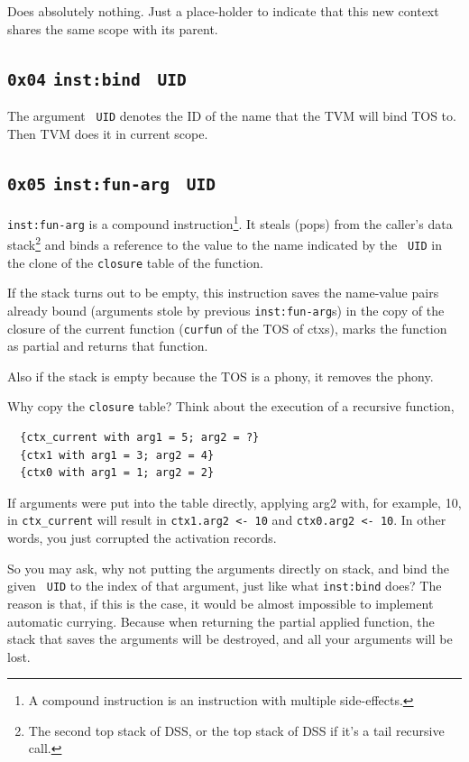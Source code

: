 \documentclass{report}
\newcommand{\mtilde}[1]{\textasciitilde}
\newcommand{\marg}[1]{\texttt{\mtilde ~#1}}
\newcommand{\inst}[1] {\texttt{inst:#1}}
\begin{document}
Does absolutely nothing. Just a place-holder to indicate that this new context shares the same scope with its parent.

\subsection{\texttt{0x04} \inst{bind} \marg{UID}}

The argument \marg{UID} denotes the ID of the name that the TVM will bind TOS to. Then TVM does it in current scope.

\subsection{\texttt{0x05} \inst{fun-arg} \marg{UID}}

\inst{fun-arg} is a compound instruction\footnote{A compound instruction is an instruction with multiple side-effects.}. It steals (pops) from the caller's data stack\footnote{The second top stack of DSS, or the top stack of DSS if it's a tail recursive call.} and binds a reference to the value to the name indicated by the \marg{UID} in the clone of the \texttt{closure} table of the function.

\begin{mdframed}[style=detail]
  If the stack turns out to be empty, this instruction saves the
  name-value pairs already bound (arguments stole by previous
  \inst{fun-arg}s) in the copy of the closure of the current function
  (\texttt{curfun} of the TOS of ctxs), marks the function as partial
  and returns that function.

  Also if the stack is empty because the TOS is a phony, it removes the
  phony.
\end{mdframed}

\begin{mdframed}[style=hint]
  Why copy the \texttt{closure} table? Think about the execution of a recursive function,

\begin{verbatim}
  {ctx_current with arg1 = 5; arg2 = ?}
  {ctx1 with arg1 = 3; arg2 = 4}
  {ctx0 with arg1 = 1; arg2 = 2}
\end{verbatim}

If arguments were put into the table directly, applying arg2 with, for example, 10, in \texttt{ctx\_current} will result in \texttt{ctx1.arg2 <- 10} and \texttt{ctx0.arg2 <- 10}. In other words, you just corrupted the activation records.

So you may ask, why not putting the arguments directly on stack, and bind the given \marg{UID} to the index of that argument, just like what \inst{bind} does? The reason is that, if this is the case, it would be almost impossible to implement automatic currying. Because when returning the partial applied function, the stack that saves the arguments will be destroyed, and all your arguments will be lost.
\end{mdframed}
\end{document}
